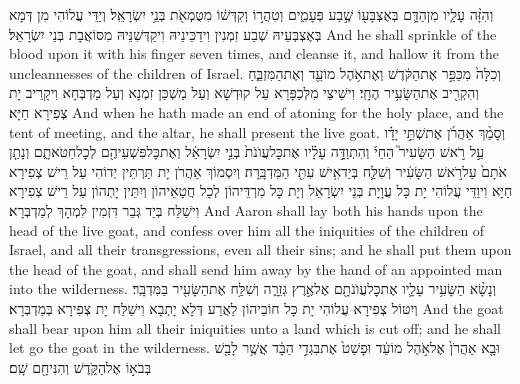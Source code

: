 {וְהִזָּ֨ה עָלָ֧יו מִן\maqqaf הַדָּ֛ם בְּאֶצְבָּע֖וֹ שֶׁ֣בַע פְּעָמִ֑ים וְטִהֲר֣וֹ וְקִדְּשׁ֔וֹ מִטֻּמְאֹ֖ת בְּנֵ֥י יִשְׂרָאֵֽל׃}
{וְיַדֵּי עֲלוֹהִי מִן דְּמָא בְּאֶצְבְּעֵיהּ שְׁבַע זִמְנִין וִידַכֵּינֵיהּ וִיקַדְּשִׁנֵּיהּ מִסּוֹאֲבָת בְּנֵי יִשְׂרָאֵל׃}
{And he shall sprinkle of the blood upon it with his finger seven times, and cleanse it, and hallow it from the uncleannesses of the children of Israel.}{}
{וְכִלָּה֙ מִכַּפֵּ֣ר אֶת\maqqaf הַקֹּ֔דֶשׁ וְאֶת\maqqaf אֹ֥הֶל מוֹעֵ֖ד וְאֶת\maqqaf הַמִּזְבֵּ֑חַ וְהִקְרִ֖יב אֶת\maqqaf הַשָּׂעִ֥יר הֶחָֽי׃}
{וִישֵׁיצֵי מִלְּכַפָּרָא עַל קוּדְשָׁא וְעַל מַשְׁכַּן זִמְנָא וְעַל מַדְבְּחָא וִיקָרֵיב יָת צְפִירָא חַיָּא׃}
{And when he hath made an end of atoning for the holy place, and the tent of meeting, and the altar, he shall present the live goat.}{}
{וְסָמַ֨ךְ אַהֲרֹ֜ן אֶת\maqqaf שְׁתֵּ֣י יָדָ֗ו עַ֣ל רֹ֣אשׁ הַשָּׂעִיר֮ הַחַי֒ וְהִתְוַדָּ֣ה עָלָ֗יו אֶת\maqqaf כׇּל\maqqaf עֲוֺנֹת֙ בְּנֵ֣י יִשְׂרָאֵ֔ל וְאֶת\maqqaf כׇּל\maqqaf פִּשְׁעֵיהֶ֖ם לְכׇל\maqqaf חַטֹּאתָ֑ם וְנָתַ֤ן אֹתָם֙ עַל\maqqaf רֹ֣אשׁ הַשָּׂעִ֔יר וְשִׁלַּ֛ח בְּיַד\maqqaf אִ֥ישׁ עִתִּ֖י הַמִּדְבָּֽרָה׃}
{וְיִסְמוֹךְ אַהֲרֹן יָת תַּרְתֵּין יְדוֹהִי עַל רֵישׁ צְפִירָא חַיָּא וִיוַדֵּי עֲלוֹהִי יָת כָּל עֲוָיָת בְּנֵי יִשְׂרָאֵל וְיָת כָּל מִרְדֵּיהוֹן לְכָל חֲטָאֵיהוֹן וְיִתֵּין יָתְהוֹן עַל רֵישׁ צְפִירָא וִישַׁלַּח בְּיַד גְּבַר דִּזְמִין לִמְהָךְ לְמַדְבְּרָא׃}
{And Aaron shall lay both his hands upon the head of the live goat, and confess over him all the iniquities of the children of Israel, and all their transgressions, even all their sins; and he shall put them upon the head of the goat, and shall send him away by the hand of an appointed man into the wilderness.}{}
{וְנָשָׂ֨א הַשָּׂעִ֥יר עָלָ֛יו אֶת\maqqaf כׇּל\maqqaf עֲוֺנֹתָ֖ם אֶל\maqqaf אֶ֣רֶץ גְּזֵרָ֑ה וְשִׁלַּ֥ח אֶת\maqqaf הַשָּׂעִ֖יר בַּמִּדְבָּֽר׃}
{וְיִטּוֹל צְפִירָא עֲלוֹהִי יָת כָּל חוֹבֵיהוֹן לַאֲרַע דְּלָא יָתְבָא וִישַׁלַּח יָת צְפִירָא בְּמַדְבְּרָא׃}
{And the goat shall bear upon him all their iniquities unto a land which is cut off; and he shall let go the goat in the wilderness.}{}
{וּבָ֤א אַהֲרֹן֙ אֶל\maqqaf אֹ֣הֶל מוֹעֵ֔ד וּפָשַׁט֙ אֶת\maqqaf בִּגְדֵ֣י הַבָּ֔ד אֲשֶׁ֥ר לָבַ֖שׁ בְּבֹא֣וֹ אֶל\maqqaf הַקֹּ֑דֶשׁ וְהִנִּיחָ֖ם שָֽׁם׃}

